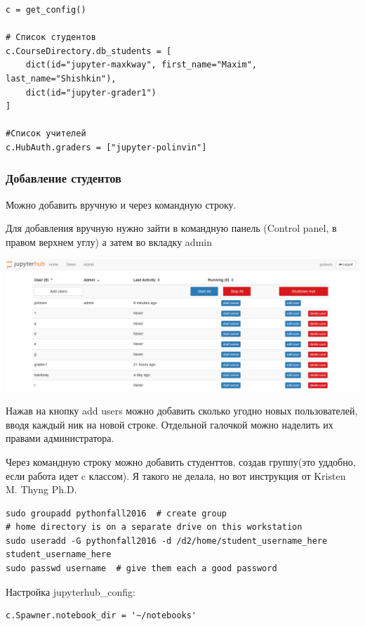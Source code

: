 \documentclass[a4paper,12pt]{article}
\begin{document}
\begin{verbatim}
с = get_config()

# Список студентов
c.CourseDirectory.db_students = [
    dict(id="jupyter-maxkway", first_name="Maxim", last_name="Shishkin"),
    dict(id="jupyter-grader1")
]

#Список учителей
c.HubAuth.graders = ["jupyter-polinvin"]
\end{verbatim}

\subsubsection{Добавление студентов}
Можно добавить вручную и через командную строку. 

Для добавления вручную нужно зайти в командную панель (Control panel, в правом верхнем углу) а затем во вкладку admin

\includegraphics[width=\textwidth]{users}

Нажав на кнопку add users можно добавить сколько угодно новых пользователей, вводя каждый ник на новой строке. Отдельной галочкой можно наделить их правами администратора.

Через командную строку можно добавить студенттов, создав группу(это уддобно, если работа идет c классом). Я такого не делала, но вот инструкция от Kristen M. Thyng Ph.D.
\begin{verbatim}
sudo groupadd pythonfall2016  # create group
# home directory is on a separate drive on this workstation
sudo useradd -G pythonfall2016 -d /d2/home/student_username_here student_username_here
sudo passwd username  # give them each a good password
\end{verbatim}

Настройка jupyterhub\_config:
\begin{verbatim}
c.Spawner.notebook_dir = '~/notebooks'
\end{verbatim}
\end{document}
